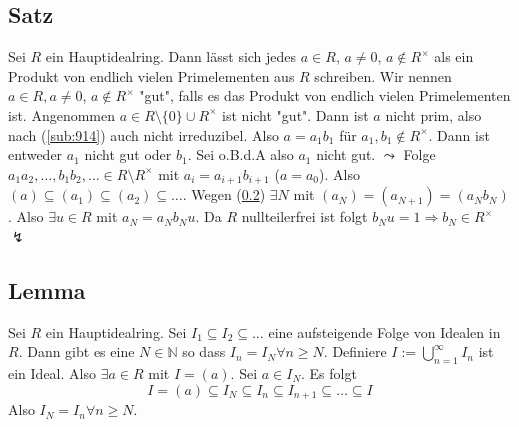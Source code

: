 \subsection[Satz über die Existenz der Primfaktorzerlegung in Hauptidealringen]{Satz} %
\label{sub:915}
Sei $R$ ein Hauptidealring. Dann lässt sich jedes $a \in R$, $a \not= 0$, $a \not\in R^\times$ als ein Produkt von endlich vielen Primelementen aus $R$ schreiben.
Wir nennen $a \in R, a \not= 0$, $a \not\in R^\times$ "gut", falls es das Produkt von endlich vielen Primelementen ist. Angenommen $a \in R \setminus \{0\} \cup R^\times$ 
ist nicht "gut". Dann ist $a$ nicht prim, also nach (\ref{sub:914}) auch nicht irreduzibel. Also $a= a_1 b_1$ für $a_1, b_1 \not\in R^\times$. Dann ist entweder $a_1$ nicht 
gut oder $b_1$. Sei o.B.d.A also $a_1$ nicht gut. $\leadsto$ Folge $a_1 a_2, \ldots , b_1 b_2, \ldots  \in R \setminus R^\times$ mit $a_i = a_{i+1} b_{i+1}$ ($a= a_0$).
Also $(a) \subseteq (a_1) \subseteq (a_2) \subseteq \ldots $. Wegen (\ref{sub:916}) $\exists N$ mit $(a_N) = (a_{N+1}) = (a_N b_N)$. Also $\exists u \in R$ mit 
$a_N = a_N b_N u$. Da $R$ nullteilerfrei ist folgt $b_N u = 1 \Rightarrow b_N \in R^\times$ {\large $\lightning$} \bewende

\subsection[Lemma über eine aufsteigende Folge von Idealen]{Lemma} %
\label{sub:916}
Sei $R$ ein Hauptidealring. Sei $I_1 \subseteq I_2 \subseteq \ldots $ eine aufsteigende Folge von Idealen in $R$. Dann gibt es eine $N \in \mathds{N}$ so dass 
$I_n = I_N \forall n \ge N$.
Definiere $I := \bigcup_{n=1}^\infty I_n$ ist ein Ideal. Also $\exists a \in R$ mit $I=(a)$. Sei $a \in I_N$. Es folgt 
\[
	I=(a) \subseteq I_N \subseteq I_n \subseteq  I_{n+1} \subseteq \ldots \subseteq I
\]
Also $I_N = I_n \forall n \ge N$. \bewende

